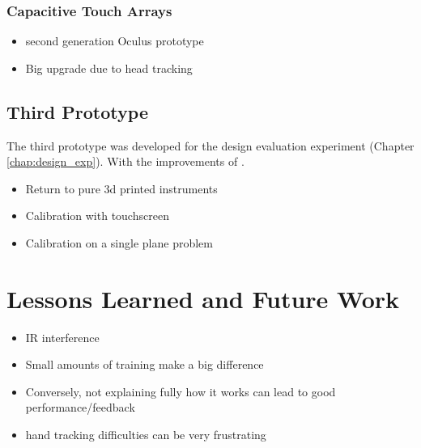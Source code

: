 \subsubsection{Capacitive Touch Arrays}


\begin{itemize}
    \item second generation Oculus prototype
    \item Big upgrade due to head tracking
\end{itemize}

\subsection{Third Prototype}

The third prototype was developed for the design evaluation experiment (Chapter \ref{chap:design_exp}).
With the improvements of .

\begin{itemize}
    \item Return to pure 3d printed instruments
    \item Calibration with touchscreen
    \item Calibration on a single plane problem
\end{itemize}

\section{Lessons Learned and Future Work}

\begin{itemize}
    \item IR interference
    \item Small amounts of training make a big difference
    \item Conversely, not explaining fully how it works can lead to good performance/feedback
    \item hand tracking difficulties can be very frustrating
\end{itemize}
